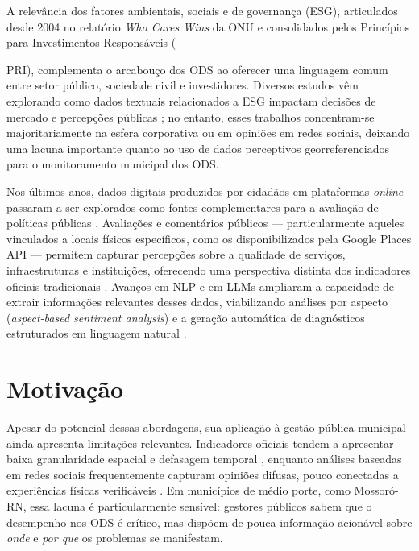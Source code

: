 A relevância dos fatores ambientais, sociais e de governança (\gls{ESG}),
articulados desde 2004 no relatório \textit{Who Cares Wins} da ONU
\cite{onu2004} e consolidados pelos Princípios para Investimentos
Responsáveis ({PRI), complementa o arcabouço dos
ODS ao oferecer uma linguagem comum entre setor público, sociedade civil e
investidores. Diversos estudos vêm explorando como dados textuais
relacionados a ESG impactam decisões de mercado e percepções públicas
\cite{schimanski2024,gupta2024,jaiswal2024,liu2023esg,bhattacherjee2023,yu2023,nyakurukwa2023};
no entanto, esses trabalhos concentram-se majoritariamente na esfera
corporativa ou em opiniões em redes sociais, deixando uma
lacuna importante quanto ao uso de dados perceptivos georreferenciados para
o monitoramento municipal dos ODS.

Nos últimos anos, dados digitais produzidos por cidadãos em plataformas
\textit{online} passaram a ser explorados como fontes complementares para a
avaliação de políticas públicas \cite{fu2023,larosa2025}. Avaliações e
comentários públicos --- particularmente aqueles vinculados a locais físicos
específicos, como os disponibilizados pela Google Places API
\cite{googleplaces2024} --- permitem capturar percepções sobre a qualidade
de serviços, infraestruturas e instituições, oferecendo uma perspectiva
distinta dos indicadores oficiais tradicionais \cite{wankhade2022}. Avanços
em \gls{NLP} e em \gls{LLM}s ampliaram a capacidade de extrair informações
relevantes desses dados, viabilizando análises por aspecto
(\textit{aspect-based sentiment analysis}) e a geração automática de
diagnósticos estruturados em linguagem natural \cite{agua2025}.

\section{Motivação}
\label{sec:motivacao}

Apesar do potencial dessas abordagens, sua aplicação à gestão pública
municipal ainda apresenta limitações relevantes. Indicadores oficiais
tendem a apresentar baixa granularidade espacial e defasagem
temporal \cite{abidoye2022}, enquanto análises baseadas em redes sociais
frequentemente capturam opiniões difusas, pouco conectadas a experiências
físicas verificáveis \cite{jaiswal2024,liu2023esg}. Em municípios de médio
porte, como Mossoró-RN, essa lacuna é particularmente sensível: gestores
públicos sabem que o desempenho nos ODS é crítico, mas dispõem de pouca
informação acionável sobre \emph{onde} e \emph{por que} os problemas se
manifestam.

}
